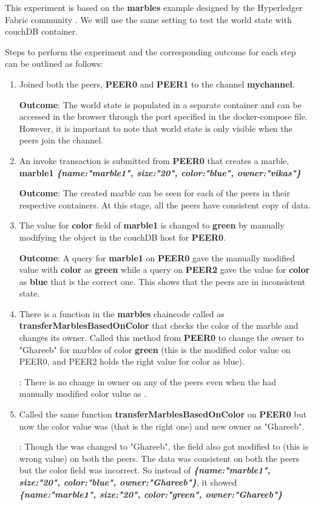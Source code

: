 \documentclass[
  a4paper,  %
  twoside,  %
  bibliography=totoc,
  headsepline,
  cleardoublepage=empty,
  parskip=half,
  draft=false
]{scrbook}
\begin{document}
This experiment is based on the \textbf{marbles} example designed by the Hyperledger Fabric community \cite{marbles}. We will use the same setting to test the world state with couchDB container.

Steps to perform the experiment and the corresponding outcome for each step can be outlined as follows:
\begin{enumerate}
    \item Joined both the peers, \textbf{PEER0} and \textbf{PEER1} to the channel \textbf{mychannel}.
    
    \textbf{Outcome}: The world state is populated in a separate container and can be accessed in the browser through the port specified in the docker-compose file. However, it is important to note that world state is only visible when the peers join the channel.
    \item An invoke transaction is submitted from \textbf{PEER0} that creates a marble, \textbf{marble1} {\ttfamily\bfseries\slshape \{name:"marble1", size:"20", color:"blue", owner:"vikas"\}}
    
    \textbf{Outcome}: The created marble can be seen for each of the peers in their respective containers. At this stage, all the peers have consistent copy of data.
    \item The value for \textbf{color} field of \textbf{marble1} is changed to \textbf{green} by manually modifying the object in the couchDB host for \textbf{PEER0}.
    
    \textbf{Outcome}: A query for \textbf{marble1} on \textbf{PEER0} gave the manually modified value with \textbf{color} as \textbf{green} while a query on \textbf{PEER2} gave the value for \textbf{color} as \textbf{blue} that is the correct one. This shows that the peers are in inconsistent state.
    \item There is a function in the \textbf{marbles} chaincode called as \textbf{transferMarblesBasedOnColor} that checks the color of the marble and changes its owner. Called this method from \textbf{PEER0} to change the owner to "Ghareeb" for marbles of color \textbf{green} (this is the modified color value on PEER0, and PEER2 holds the right value for color as blue). 
    
    : There is no change in owner on any of the peers even when the  had manually modified color value as .
    \item Called the same function \textbf{transferMarblesBasedOnColor} on \textbf{PEER0} but now the color value was  (that is the right one) and new owner as "Ghareeb".
    
    : Though the  was changed to "Ghareeb", the  field also got modified to  (this is wrong value) on both the peers. The data was consistent on both the peers but the color field was incorrect. So instead of {\ttfamily\bfseries\slshape \{name:"marble1", size:"20", color:"blue", owner:"Ghareeb"\}}, it showed {\ttfamily\bfseries\slshape \{name:"marble1", size:"20", color:"green", owner:"Ghareeb"\}}
\end{enumerate}
\end{document}
